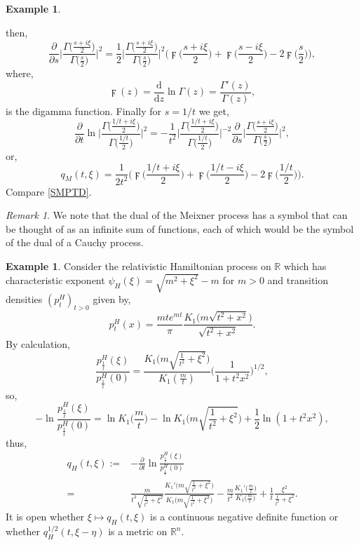 \documentclass[a4paper, 12pt]{report}
\theoremstyle{cor}
\theoremstyle{remark}
\newtheorem{remark}[theorem]{Remark}
\theoremstyle{definition}
\newtheorem{eg}[theorem]{Example}
\begin{document}
\begin{eg}
\begin{itemize}
$$$$
then,
$$
\frac{\partial}{\partial s}\bigg|\frac{\Gamma\big(\frac{s + i\xi}{2}\big)}{\Gamma\big(\frac{s}{2}\big)}\bigg|^2 = \frac{1}{2}\bigg|\frac{\Gamma\big(\frac{s + i\xi}{2}\big)}{\Gamma\big(\frac{s}{2}\big)}\bigg|^2\bigg(\digamma\bigg(\frac{s + i\xi}{2}\bigg) + \digamma\bigg(\frac{s - i\xi}{2}\bigg) - 2\digamma\bigg(\frac{s}{2}\bigg)\bigg),
$$
where,
$$
\digamma(z) = \frac{\mathrm{d}}{\mathrm{d}z}\ln\Gamma(z) = \frac{\Gamma'(z)}{\Gamma(z)},
$$
is the digamma function.  Finally for $s = 1/t$ we get,
$$
\frac{\partial}{\partial t}\ln\bigg|\frac{\Gamma\big(\frac{1/t + i\xi}{2}\big)}{\Gamma\big(\frac{1/t}{2}\big)}\bigg|^2 = -\frac{1}{t^2}\bigg|\frac{\Gamma\big(\frac{1/t + i\xi}{2}\big)}{\Gamma\big(\frac{1/t}{2}\big)}\bigg|^{-2}\frac{\partial}{\partial s}\bigg|\frac{\Gamma\big(\frac{s + i\xi}{2}\big)}{\Gamma\big(\frac{s}{2}\big)}\bigg|^2,
$$
or,
$$
q_M(t, \xi) = \frac{1}{2t^2}\Bigg(\digamma\bigg(\frac{1/t + i\xi}{2}\bigg) + \digamma\bigg(\frac{1/t - i\xi}{2}\bigg) - 2\digamma\bigg(\frac{1/t}{2}\bigg)\Bigg).
$$
Compare \eqref{SMPTD}.
\end{itemize}
\end{eg}
\begin{remark}
We note that the dual of the Meixner process has a symbol that can be thought of as an infinite sum of functions, each of which would be the symbol of the dual of a Cauchy process.
\end{remark}

\begin{eg}
Consider the relativistic Hamiltonian process on $\mathbb{R}$ which has characteristic exponent $\psi_H(\xi) = \sqrt{m^2 + \xi^2} - m$ for $m > 0$ and transition densities $(p_t^H)_{t > 0}$ given by,
$$
p_t^H(x) = \frac{mte^{mt}}{\pi}\frac{K_1\big(m\sqrt{t^2 + x^2}\big)}{\sqrt{t^2 + x^2}}.
$$
By calculation,
$$
\frac{p_\frac{1}{t}^H(\xi)}{p_\frac{1}{t}^H(0)} = \frac{K_1\Big(m\sqrt{\frac{1}{t^2} + \xi^2}\Big)}{K_1(\frac{m}{t})}\bigg(\frac{1}{1 + t^2x^2}\bigg)^{1/2},
$$
so,
$$
-\ln\frac{p_\frac{1}{t}^H(\xi)}{p_\frac{1}{t}^H(0)} = \ln K_1\Big(\frac{m}{t}\Big) - \ln K_1\bigg(m\sqrt{\frac{1}{t^2} + \xi^2}\bigg) + \frac{1}{2}\ln(1 + t^2x^2),
$$
thus,
$$
\begin{aligned}
q_H(t, \xi) := & -\frac{\partial}{\partial t}\ln\frac{p_\frac{1}{t}^H(\xi)}{p_\frac{1}{t}^H(0)}\\
= & \frac{m}{t^3\sqrt{\frac{1}{t^2} + \xi^2}}\frac{K_1'\Big(m\sqrt{\frac{1}{t^2} + \xi^2}\Big)}{K_1\Big(m\sqrt{\frac{1}{t^2} + \xi^2}\Big)} - \frac{m}{t^2}\frac{K_1'\big(\frac{m}{t}\big)}{K_1\big(\frac{m}{t}\big)} + \frac{1}{t}\frac{\xi^2}{\frac{1}{t^2} + \xi^2}.
\end{aligned}
$$
It is open whether $\xi \mapsto q_H(t, \xi)$ is a continuous negative definite function or whether $q_H^{1/2}(t, \xi - \eta)$ is a metric on $\mathbb{R}^n$.
\end{eg}
\end{document}
